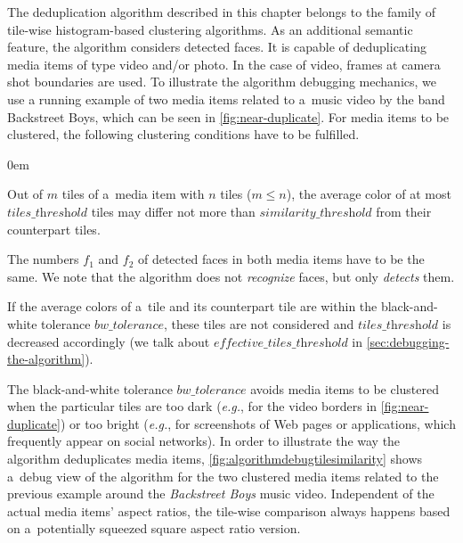 The deduplication algorithm described in this chapter
belongs to the family of tile-wise histogram-based clustering algorithms.
As an additional semantic feature, the algorithm considers detected faces.
It is capable of deduplicating media items of type video and/or photo.
In the case of video, frames at camera shot boundaries are used.
To illustrate the algorithm debugging mechanics,
we use a running example of two media items related to a~music video by the 
band Backstreet Boys, which can be seen in \autoref{fig:near-duplicate}.
For media items to be clustered,
the following clustering conditions have to be fulfilled.

\begin{description}
  \itemsep0em
  \item[Cond.~1] Out of $m$ tiles of a~media item with $n$ tiles ($m \leq n$),
    the average color of at most $\textit{tiles\_threshold}$ tiles
    may differ not more than $\textit{similarity\_threshold}$
    from their counterpart tiles.
  \item[Cond.~2] The numbers $f_1$ and $f_2$ of detected faces
    in both media items have to be the same.
    We note that the algorithm does not \emph{recognize} faces,
    but only \emph{detects} them.
  \item[Cond.~3] If the average colors of a~tile and its counterpart tile
    are within the black-and-white tolerance $\textit{bw\_tolerance}$,
    these tiles are not considered and $\textit{tiles\_threshold}$
    is decreased accordingly (we talk about $\textit{effective\_tiles\_threshold}$
    in \autoref{sec:debugging-the-algorithm}).
\end{description}

The black-and-white tolerance $\textit{bw\_tolerance}$ avoids media items
to be clustered when the particular tiles are too dark (\emph{e.g.},
for the video borders in \autoref{fig:near-duplicate}) or too bright (\emph{e.g.},
for screenshots of Web pages or applications, which frequently appear on social networks).
In order to illustrate the way the algorithm deduplicates media items,
\autoref{fig:algorithmdebugtilesimilarity} shows a~debug view of the algorithm
for the two clustered media items related to the previous example
around the \emph{Backstreet Boys} music video.
Independent of the actual media items' aspect ratios,
the tile-wise comparison always happens based on
a~potentially squeezed square aspect ratio version.

